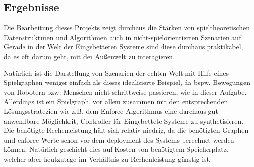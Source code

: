 \subsection{Ergebnisse}
Die Bearbeitung dieses Projekts zeigt durchaus die Stärken von spieltheoretischen Datenstrukturen und Algorithmen auch in nicht-spielorientierten Szenarien auf. Gerade in der Welt der Eingebetteten Systeme sind diese durchaus praktikabel, da es oft darum geht, mit der Außenwelt zu interagieren.\par
Natürlich ist die Darstellung von Szenarien der echten Welt mit Hilfe eines Spielgraphen weniger einfach als dieses idealisierte Beispiel, da bspw. Bewegungen von Robotern bzw. Menschen nicht schrittweise passieren, wie in dieser Aufgabe. Allerdings ist ein Spielgraph, vor allem zusammen mit den entsprechenden Lösungsstrategien wie z.B. dem Enforce-Algorithmus eine durchaus gut anwendbare Möglichkeit, Controller für Eingebettete Systeme zu synthetisieren. Die benötigte Rechenleistung hält sich relativ niedrig, da die benötigten Graphen und enforce-Werte schon vor dem deployment des Systems berechnet werden können. Natürlich geschieht dies auf Kosten von benötigtem Speicherplatz, welcher aber heutzutage im Verhältnis zu Rechenleistung günstig ist.